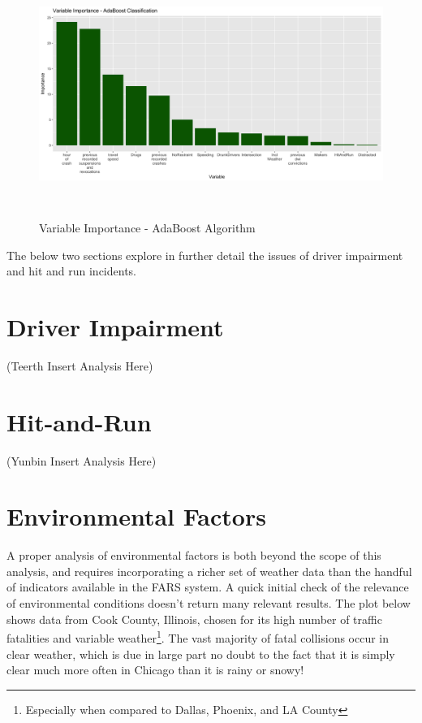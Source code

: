 \documentclass[11pt, oneside,titlepage]{article}   	%
\begin{document}
\begin{figure}[H]
\centering
  \includegraphics[width=15cm,height=8cm,keepaspectratio]{ImportancePlot_ADABoost.png}
\caption{Variable Importance - AdaBoost Algorithm}
\end{figure}

The below two sections explore in further detail the issues of driver impairment and hit and run incidents.

\section*{Driver Impairment}

(Teerth Insert Analysis Here)

\section*{Hit-and-Run}

(Yunbin Insert Analysis Here)


\section*{Environmental Factors}
A proper analysis of environmental factors is both beyond the scope of this analysis, and requires incorporating a richer set of weather data than the handful of indicators available in the FARS system. A quick initial check of the relevance of environmental conditions doesn't return many relevant results. The plot below shows data from Cook County, Illinois, chosen for its high number of traffic fatalities and variable weather\footnote{Especially when compared to Dallas, Phoenix, and LA County}. The vast majority of fatal collisions occur in clear weather, which is due in large part no doubt to the fact that it is simply clear much more often in Chicago than it is rainy or snowy! 
\end{document}
